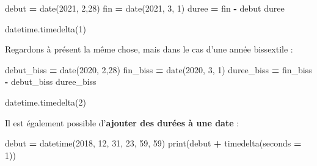\documentclass[
  12pt,
]{book}
\newenvironment{Shaded}{\begin{snugshade}}{\end{snugshade}}
\newcommand{\BuiltInTok}[1]{#1}
\newcommand{\DecValTok}[1]{\textcolor[rgb]{0.00,0.00,0.81}{#1}}
\newcommand{\NormalTok}[1]{#1}
\newcommand{\OperatorTok}[1]{\textcolor[rgb]{0.81,0.36,0.00}{\textbf{#1}}}
\numberwithin{equation}{section}
\numberwithin{countremarque}{section}
\begin{document}
\begin{Shaded}
\begin{Highlighting}[]
\NormalTok{debut }\OperatorTok{=}\NormalTok{ date(}\DecValTok{2021}\NormalTok{, }\DecValTok{2}\NormalTok{,}\DecValTok{28}\NormalTok{)}
\NormalTok{fin }\OperatorTok{=}\NormalTok{ date(}\DecValTok{2021}\NormalTok{, }\DecValTok{3}\NormalTok{, }\DecValTok{1}\NormalTok{)}
\NormalTok{duree }\OperatorTok{=}\NormalTok{ fin }\OperatorTok{{-}}\NormalTok{ debut}
\NormalTok{duree}
\end{Highlighting}
\end{Shaded}

\begin{Shaded}
\begin{Highlighting}[]
\NormalTok{datetime.timedelta(}\DecValTok{1}\NormalTok{)}
\end{Highlighting}
\end{Shaded}

Regardons à présent la même chose, mais dans le cas d'une année bissextile :

\begin{Shaded}
\begin{Highlighting}[]
\NormalTok{debut\_biss }\OperatorTok{=}\NormalTok{ date(}\DecValTok{2020}\NormalTok{, }\DecValTok{2}\NormalTok{,}\DecValTok{28}\NormalTok{)}
\NormalTok{fin\_biss }\OperatorTok{=}\NormalTok{ date(}\DecValTok{2020}\NormalTok{, }\DecValTok{3}\NormalTok{, }\DecValTok{1}\NormalTok{)}
\NormalTok{duree\_biss }\OperatorTok{=}\NormalTok{ fin\_biss }\OperatorTok{{-}}\NormalTok{ debut\_biss}
\NormalTok{duree\_biss}
\end{Highlighting}
\end{Shaded}

\begin{Shaded}
\begin{Highlighting}[]
\NormalTok{datetime.timedelta(}\DecValTok{2}\NormalTok{)}
\end{Highlighting}
\end{Shaded}

Il est également possible d'\textbf{ajouter des durées à une date} :

\begin{Shaded}
\begin{Highlighting}[]
\NormalTok{debut }\OperatorTok{=}\NormalTok{ datetime(}\DecValTok{2018}\NormalTok{, }\DecValTok{12}\NormalTok{, }\DecValTok{31}\NormalTok{, }\DecValTok{23}\NormalTok{, }\DecValTok{59}\NormalTok{, }\DecValTok{59}\NormalTok{)}
\BuiltInTok{print}\NormalTok{(debut }\OperatorTok{+}\NormalTok{ timedelta(seconds }\OperatorTok{=} \DecValTok{1}\NormalTok{))}
\end{Highlighting}
\end{Shaded}
\end{document}
